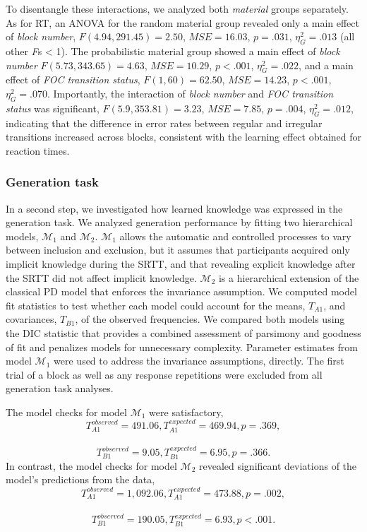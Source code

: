 \documentclass[floatsintext,man]{apa6}
\begin{document}
To disentangle these interactions, we analyzed both \emph{material}
groups separately. As for RT, an ANOVA for the random material group
revealed only a main effect of \emph{block number},
\(F(4.94, 291.45) = 2.50\), \(\mathit{MSE} = 16.03\), \(p = .031\),
\(\eta^2_G = .013\) (all other \emph{F}s \textless{} 1). The
probabilistic material group showed a main effect of \emph{block number}
\(F(5.73, 343.65) = 4.63\), \(\mathit{MSE} = 10.29\), \(p < .001\),
\(\eta^2_G = .022\), and a main effect of \emph{FOC transition status},
\(F(1, 60) = 62.50\), \(\mathit{MSE} = 14.23\), \(p < .001\),
\(\eta^2_G = .070\). Importantly, the interaction of \emph{block number}
and \emph{FOC transition status} was significant,
\(F(5.9, 353.81) = 3.23\), \(\mathit{MSE} = 7.85\), \(p = .004\),
\(\eta^2_G = .012\), indicating that the difference in error rates
between regular and irregular transitions increased across blocks,
consistent with the learning effect obtained for reaction times.

\subsubsection{Generation task}\label{generation-task}

In a second step, we investigated how learned knowledge was expressed in
the generation task. We analyzed generation performance by fitting two
hierarchical models, \(\mathcal{M}_1\) and \(\mathcal{M}_2\).
\(\mathcal{M}_1\) allows the automatic and controlled processes to vary
between inclusion and exclusion, but it assumes that participants
acquired only implicit knowledge during the SRTT, and that revealing
explicit knowledge after the SRTT did not affect implicit knowledge.
\(\mathcal{M}_2\) is a hierarchical extension of the classical PD model
that enforces the invariance assumption. We computed model fit
statistics to test whether each model could account for the means,
\(T_{A1}\), and covariances, \(T_{B1}\), of the observed frequencies. We
compared both models using the DIC statistic that provides a combined
assessment of parsimony and goodness of fit and penalizes models for
unnecessary complexity. Parameter estimates from model \(\mathcal{M}_1\)
were used to address the invariance assumptions, directly. The first
trial of a block as well as any response repetitions were excluded from
all generation task analyses.

The model checks for model \(\mathcal{M}_1\) were satisfactory,
\[T_{A1}^{observed} = 491.06, T_{A1}^{expected} = 469.94, p = .369,\]~
\[T_{B1}^{observed} = 9.05, T_{B1}^{expected} = 6.95, p = .366.\] In
contrast, the model checks for model \(\mathcal{M}_2\) revealed
significant deviations of the model's predictions from the data,
\[T_{A1}^{observed} = 1,092.06, T_{A1}^{expected} = 473.88, p = .002,\]~
\[T_{B1}^{observed} = 190.05, T_{B1}^{expected} = 6.93, p < .001.\]
\end{document}
